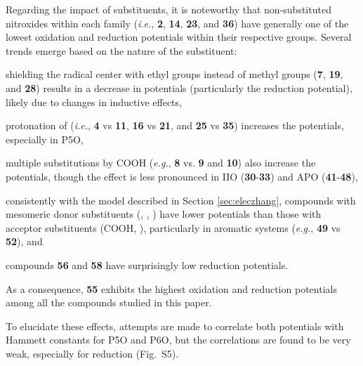 \documentclass[review,preprint]{elsarticle}
\begin{document}
Regarding the impact of substituents, it is noteworthy that non-substituted nitroxides within each family (\textit{i.e.}, \textbf{2}, \textbf{14}, \textbf{23}, and \textbf{36}) have generally one of the lowest oxidation and reduction potentials within their respective groups. Several trends emerge based on the nature of the substituent: \begin{inparaenum}[(i)]
	\item shielding the radical center with ethyl groups instead of methyl groups (\textbf{7}, \textbf{19}, and \textbf{28}) results in a decrease in potentials (particularly the reduction potential), likely due to changes in inductive effects,
	\item protonation of  (\textit{i.e.}, \textbf{4} vs \textbf{11}, \textbf{16} vs \textbf{21}, and \textbf{25} vs \textbf{35}) increases the potentials, especially in P5O,
	\item multiple substitutions by COOH (\textit{e.g.}, \textbf{8} vs. \textbf{9} and \textbf{10}) also increase the potentials, though the effect is less pronounced in IIO (\textbf{30}-\textbf{33}) and APO (\textbf{41}-\textbf{48}),
	\item consistently with the model described in Section \ref{sec:eleczhang}, compounds with mesomeric donor substituents (, , ) have lower potentials than those with acceptor substituents (COOH, ), particularly in aromatic systems (\textit{e.g.}, \textbf{49} vs \textbf{52}), and
	\item compounds \textbf{56} and \textbf{58} have surprisingly low reduction potentials.
\end{inparaenum}
As a consequence, \textbf{55} exhibits the highest oxidation and reduction potentials among all the compounds studied in this paper.

To elucidate these effects, attempts are made to correlate both potentials with Hammett constants for P5O and P6O, but the correlations are found to be very weak, especially for reduction (Fig.~S5). 
\end{document}
